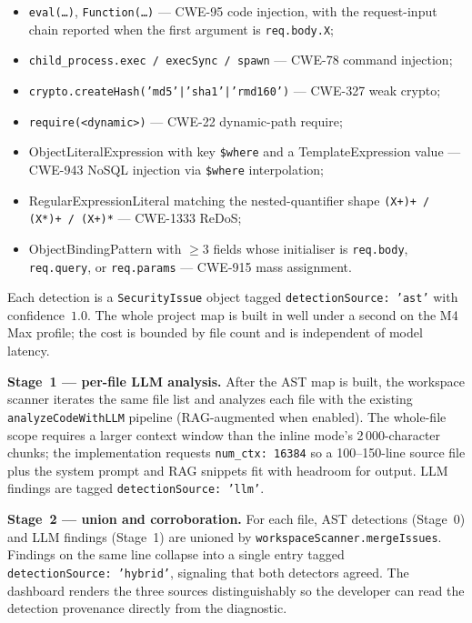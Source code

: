 \begin{itemize}
  \item \texttt{eval(\dots)}, \texttt{Function(\dots)} --- CWE-95 code injection, with the request-input chain reported when the first argument is \texttt{req.body.X};
  \item \texttt{child\_process.exec / execSync / spawn} --- CWE-78 command injection;
  \item \texttt{crypto.createHash('md5'|'sha1'|'rmd160')} --- CWE-327 weak crypto;
  \item \texttt{require(<dynamic>)} --- CWE-22 dynamic-path require;
  \item ObjectLiteralExpression with key \texttt{\$where} and a TemplateExpression value --- CWE-943 NoSQL injection via \texttt{\$where} interpolation;
  \item RegularExpressionLiteral matching the nested-quantifier shape \texttt{(X+)+ / (X*)+ / (X+)*} --- CWE-1333 ReDoS;
  \item ObjectBindingPattern with $\geq 3$ fields whose initialiser is \texttt{req.body}, \texttt{req.query}, or \texttt{req.params} --- CWE-915 mass assignment.
\end{itemize}

Each detection is a \texttt{SecurityIssue} object tagged \texttt{detectionSource:\,'ast'} with confidence~$1.0$. The whole project map is built in well under a second on the M4 Max profile; the cost is bounded by file count and is independent of model latency.

\textbf{Stage~1 --- per-file LLM analysis.} After the AST map is built, the workspace scanner iterates the same file list and analyzes each file with the existing \texttt{analyzeCodeWithLLM} pipeline (RAG-augmented when enabled). The whole-file scope requires a larger context window than the inline mode's 2\,000-character chunks; the implementation requests \texttt{num\_ctx:\,16384} so a 100--150-line source file plus the system prompt and RAG snippets fit with headroom for output. LLM findings are tagged \texttt{detectionSource:\,'llm'}.

\textbf{Stage~2 --- union and corroboration.} For each file, AST detections (Stage~0) and LLM findings (Stage~1) are unioned by \texttt{workspaceScanner.mergeIssues}. Findings on the same line collapse into a single entry tagged \texttt{detectionSource:\,'hybrid'}, signaling that both detectors agreed. The dashboard renders the three sources distinguishably so the developer can read the detection provenance directly from the diagnostic.

